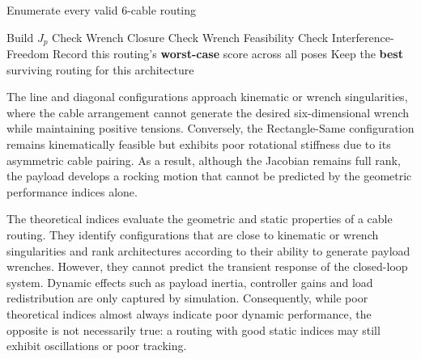 \begin{algorithm}[h]
\caption{Cable Routing Optimization and Architecture Ranking}
\label{alg:cable_optimization}
\begin{algorithmic}[1]

    \State Enumerate every valid 6-cable routing
    
            \State Build $J_p$  
            \State Check Wrench Closure 
            \State Check Wrench Feasibility 
            \State Check Interference-Freedom 
        \EndFor
        \State Record this routing's \textbf{worst-case} score across all poses
    \EndFor
    \State Keep the \textbf{best} surviving routing for this architecture
\EndFor

\end{algorithmic}
\end{algorithm}



The line and diagonal configurations approach kinematic or wrench singularities, where the cable arrangement cannot generate the desired six-dimensional wrench while maintaining positive tensions. Conversely, the Rectangle-Same configuration remains kinematically feasible but exhibits poor rotational stiffness due to its asymmetric cable pairing. As a result, although the Jacobian remains full rank, the payload develops a rocking motion that cannot be predicted by the geometric performance indices alone.



The theoretical indices evaluate the geometric and static properties of a cable routing. They identify configurations that are close to kinematic or wrench singularities and rank architectures according to their ability to generate payload wrenches. However, they cannot predict the transient response of the closed-loop system. Dynamic effects such as payload inertia, controller gains and load redistribution are only captured by simulation. Consequently, while poor theoretical indices almost always indicate poor dynamic performance, the opposite is not necessarily true: a routing with good static indices may still exhibit oscillations or poor tracking.

